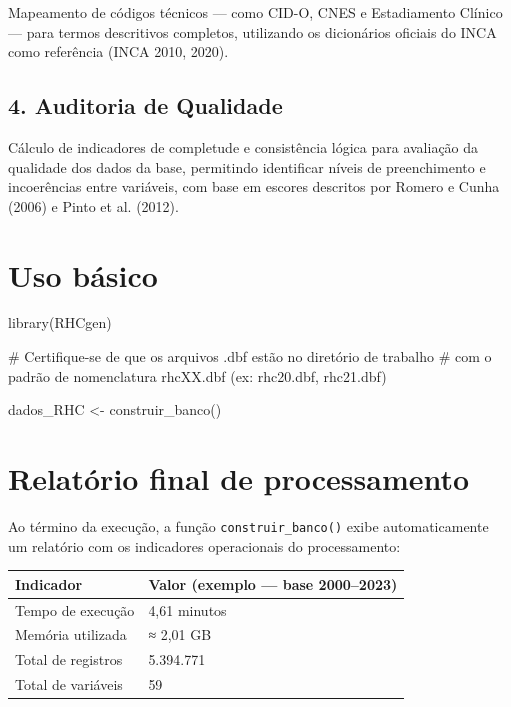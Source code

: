 \documentclass[
  brazilian,
  a4paper,
  oneside]{scrbook}
\newenvironment{Shaded}{\begin{snugshade}}{\end{snugshade}}
\newcommand{\CommentTok}[1]{\textcolor[rgb]{0.37,0.37,0.37}{#1}}
\newcommand{\FunctionTok}[1]{\textcolor[rgb]{0.28,0.35,0.67}{#1}}
\newcommand{\NormalTok}[1]{\textcolor[rgb]{0.00,0.23,0.31}{#1}}
\newcommand{\OtherTok}[1]{\textcolor[rgb]{0.00,0.23,0.31}{#1}}
\newcounter{none} %
\begin{document}
Mapeamento de códigos técnicos --- como CID-O, CNES e Estadiamento
Clínico --- para termos descritivos completos, utilizando os dicionários
oficiais do INCA como referência (INCA 2010, 2020).

\subsection{4. Auditoria de Qualidade}\label{auditoria-de-qualidade}

Cálculo de indicadores de completude e consistência lógica para
avaliação da qualidade dos dados da base, permitindo identificar níveis
de preenchimento e incoerências entre variáveis, com base em escores
descritos por Romero e Cunha (2006) e Pinto et al. (2012).

\section{Uso básico}\label{uso-buxe1sico}

\begin{Shaded}
\begin{Highlighting}[]
\FunctionTok{library}\NormalTok{(RHCgen)}

\CommentTok{\# Certifique{-}se de que os arquivos .dbf estão no diretório de trabalho}
\CommentTok{\# com o padrão de nomenclatura rhcXX.dbf (ex: rhc20.dbf, rhc21.dbf)}

\NormalTok{dados\_RHC }\OtherTok{\textless{}{-}} \FunctionTok{construir\_banco}\NormalTok{()}
\end{Highlighting}
\end{Shaded}

\section{Relatório final de
processamento}\label{relatuxf3rio-final-de-processamento}

Ao término da execução, a função \texttt{construir\_banco()} exibe
automaticamente um relatório com os indicadores operacionais do
processamento:

{\def\LTcaptype{none} %
\begin{longtable}[]{@{}ll@{}}
\toprule\noalign{}
Indicador & Valor (exemplo --- base 2000--2023) \\
\midrule\noalign{}
\endhead
\bottomrule\noalign{}
\endlastfoot
Tempo de execução & 4,61 minutos \\
Memória utilizada & ≈ 2,01 GB \\
Total de registros & 5.394.771 \\
Total de variáveis & 59 \\
\end{longtable}
}
\end{document}
